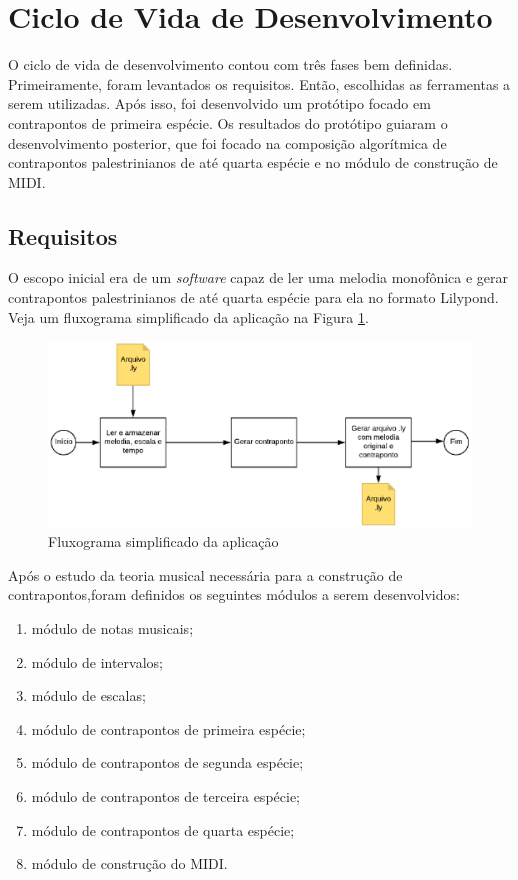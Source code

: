   \section[Ciclo de Vida de Desenvolvimento]{Ciclo de Vida de Desenvolvimento}

    O ciclo de vida de desenvolvimento contou com três fases bem definidas. Primeiramente, foram levantados os requisitos. Então, escolhidas as ferramentas a serem utilizadas. Após isso, foi desenvolvido um protótipo focado em contrapontos de primeira espécie. Os resultados do protótipo guiaram o desenvolvimento posterior, que foi focado na composição algorítmica de contrapontos palestrinianos de até quarta espécie e no módulo de construção de MIDI.

  \subsection[Requisitos]{Requisitos} \label{sssec:req}

    O escopo inicial era de um \textit{software} capaz de ler uma melodia monofônica e gerar contrapontos palestrinianos de até quarta espécie para ela no formato Lilypond. Veja um fluxograma simplificado da aplicação na Figura \ref{fluxograma}.

    \begin{figure}[htb]
      \centering
      \includegraphics[scale=1]{figuras/fluxograma.eps}
      \caption{Fluxograma simplificado da aplicação}
      \label{fluxograma}
    \end{figure}


    Após o estudo da teoria musical necessária para a construção de contrapontos,foram definidos os seguintes módulos a serem desenvolvidos:

    \begin{enumerate}
      \item módulo de notas musicais;
      \item módulo de intervalos;
      \item módulo de escalas;
      \item módulo de contrapontos de primeira espécie;
      \item módulo de contrapontos de segunda espécie;
      \item módulo de contrapontos de terceira espécie;
      \item módulo de contrapontos de quarta espécie;
      \item módulo de construção do MIDI.
    \end{enumerate}

